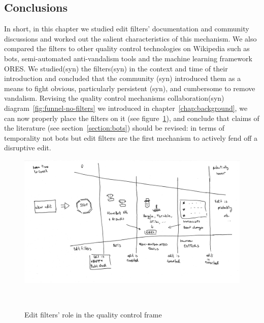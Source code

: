 \subsection{Conclusions}

In short, in this chapter we studied edit filters' documentation and community discussions and worked out the salient characteristics of this mechanism.
We also compared the filters to other quality control technologies on Wikipedia such as bots, semi-automated anti-vandalism tools and the machine learning framework ORES.
We studied(syn) the filters(syn) in the context and time of their introduction and concluded that the community (syn) introduced them as a means to fight obvious, particularly persistent (syn), and cumbersome to remove vandalism.
Revising the quality control mechanisms collaboration(syn) diagram~\ref{fig:funnel-no-filters} we introduced in chapter~\ref{chap:background}, we can now properly place the filters on it (see figure~\ref{fig:funnel-with-filters}),
and conclude that claims of the literature (see section~\ref{section:bots}) should be revised: in terms of temporality not bots but edit filters are the first mechanism to actively fend off a disruptive edit.

\begin{figure}
\centering
  \includegraphics[width=0.9\columnwidth]{pics/funnel-with-filters.png}
  \caption{Edit filters' role in the quality control frame}~\label{fig:funnel-with-filters}
\end{figure}
